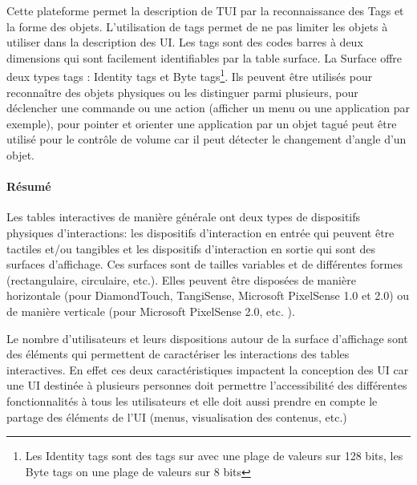 Cette plateforme permet la description de TUI par la reconnaissance des Tags et la forme des objets. L'utilisation de tags permet de ne pas limiter les objets à utiliser dans la description des UI. Les tags sont des codes barres à deux dimensions qui sont facilement identifiables par la table surface. La Surface offre deux types tags : Identity tags et Byte tags\footnote{Les Identity tags sont des tags sur avec une plage de valeurs sur 128 bits, les Byte tags on une plage de valeurs sur 8 bits}. Ils peuvent être utilisés pour reconnaître des objets physiques ou les distinguer parmi plusieurs, pour déclencher une commande ou une action (afficher un menu ou une application par exemple), pour pointer et orienter une application par un objet tagué peut être utilisé pour le contrôle de volume car il peut détecter le changement d'angle d'un objet.

\paragraph{Résumé}
\label{sec:chap2:3:1:4}
Les tables interactives de manière générale ont deux types de dispositifs physiques d'interactions: les dispositifs d'interaction en entrée qui  peuvent être tactiles et/ou tangibles et les dispositifs d'interaction en sortie qui sont des surfaces d'affichage. Ces surfaces sont de tailles variables et de différentes formes (rectangulaire, circulaire, etc.). Elles peuvent être disposées de manière horizontale (pour DiamondTouch, TangiSense, Microsoft PixelSense 1.0 et 2.0) ou de manière verticale (pour Microsoft PixelSense 2.0, etc. ).
 
Le nombre d'utilisateurs et leurs dispositions autour de la surface d'affichage sont des éléments qui permettent de caractériser les interactions des tables interactives. En effet ces deux caractéristiques impactent la conception des UI car une UI destinée à plusieurs personnes doit permettre l'accessibilité des différentes fonctionnalités à tous les utilisateurs et elle doit aussi prendre en compte le partage des éléments de l'UI (menus, visualisation des contenus, etc.)


